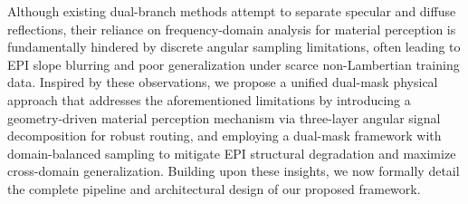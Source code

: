 Although existing dual-branch methods attempt to separate specular and diffuse reflections, their reliance on frequency-domain analysis for material perception is fundamentally hindered by discrete angular sampling limitations, often leading to EPI slope blurring and poor generalization under scarce non-Lambertian training data. Inspired by these observations, we propose a unified dual-mask physical approach that addresses the aforementioned limitations by introducing a geometry-driven material perception mechanism via three-layer angular signal decomposition for robust routing, and employing a dual-mask framework with domain-balanced sampling to mitigate EPI structural degradation and maximize cross-domain generalization. Building upon these insights, we now formally detail the complete pipeline and architectural design of our proposed framework.